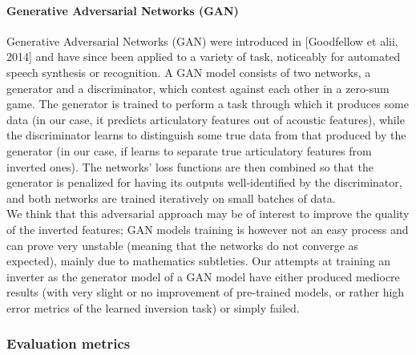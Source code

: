 {\color{gray}\paragraph{Generative Adversarial Networks (GAN)}

Generative Adversarial Networks (GAN) were introduced in [Goodfellow et alii, 2014] and have since been applied to a variety of task, noticeably for automated speech synthesis or recognition. A GAN model consists of two networks, a generator and a discriminator, which contest against each other in a zero-sum game. The generator is trained to perform a task through which it produces some data (in our case, it predicts articulatory features out of acoustic features), while the discriminator learns to distinguish some true data from that produced by the generator (in our case, if learns to separate true articulatory features from inverted ones). The networks' loss functions are then combined so that the generator is penalized for having its outputs well-identified by the discriminator, and both networks are trained iteratively on small batches of data.\\

We think that this adversarial approach may be of interest to improve the quality of the inverted features; GAN models training is however not an easy process and can prove very unstable (meaning that the networks do not converge as expected), mainly due to mathematics subtleties. Our attempts at training an inverter as the generator model of a GAN model have either produced mediocre results (with very slight or no improvement of pre-trained models, or rather high error metrics of the learned inversion task) or simply failed. %
}

\subsubsection{Evaluation metrics}
